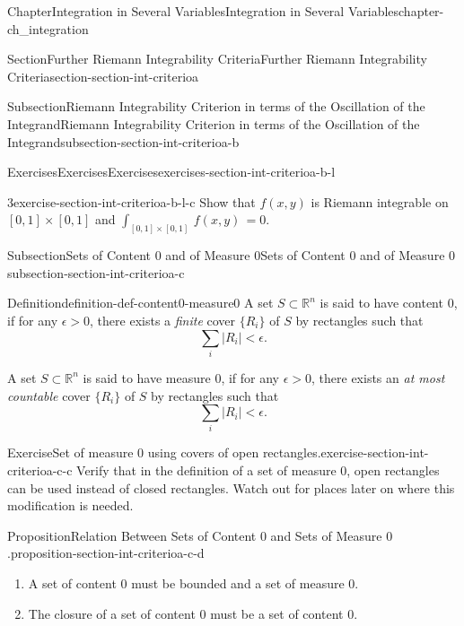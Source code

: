 \documentclass[oneside,10pt,]{book}
\numberwithin{equation}{section}
\newcommand{\bbR}{\mathbb{R}}
\begin{document}
\begin{chapterptx}{Chapter}{Integration in Several Variables}{}{Integration in Several Variables}{}{}{chapter-ch_integration}
\begin{sectionptx}{Section}{Further Riemann Integrability Criteria}{}{Further Riemann Integrability Criteria}{}{}{section-section-int-criterioa}
\begin{subsectionptx}{Subsection}{Riemann Integrability Criterion in terms of the Oscillation of the Integrand}{}{Riemann Integrability Criterion in terms of the Oscillation of the Integrand}{}{}{subsection-section-int-criterioa-b}
\begin{exercises-subsubsection-numberless}{Exercises}{Exercises}{}{Exercises}{}{}{exercises-section-int-criterioa-b-l}
\begin{divisionexercise}{3}{}{}{exercise-section-int-criterioa-b-l-c}
Show that \(f(x, y)\) is Riemann integrable on \([0, 1]\times [0, 1]\) and \(\int_{[0, 1]\times [0, 1]} \, f(x, y)\,  =0\).%
\end{divisionexercise}%
\end{exercises-subsubsection-numberless}
\end{subsectionptx}
%
%
\typeout{************************************************}
\typeout{************************************************}
%
\begin{subsectionptx}{Subsection}{Sets of Content \(0\) and of Measure \(0\)}{}{Sets of Content \(0\) and of Measure \(0\)}{}{}{subsection-section-int-criterioa-c}
\begin{definition}{Definition}{}{definition-def-content0-measure0}%
%
A set \(S\subset \bbR^{n}\) is said to have content \(0\), if for any \(\epsilon >0\), there exists a \emph{finite} cover \(\{R_{i}\} \) of \(S\) by rectangles such that%
\begin{equation*}
\sum_{i}\vert R_{i}\vert < \epsilon.
\end{equation*}
%
\par
A set \(S\subset \bbR^{n}\) is said to have measure \(0\), if for any \(\epsilon >0\), there exists an \emph{at most countable} cover \(\{R_{i}\} \) of \(S\) by rectangles such that%
\begin{equation*}
\sum_{i}\vert R_{i}\vert < \epsilon.
\end{equation*}
%
\end{definition}
\begin{inlineexercise}{Exercise}{Set of measure \(0\) using covers of open rectangles.}{exercise-section-int-criterioa-c-c}%
Verify that in the definition of a set of measure \(0\), open rectangles can be used instead of closed rectangles.  Watch out for places later on where this modification is needed.%
\end{inlineexercise}%
\begin{proposition}{Proposition}{Relation Between Sets of Content \(0\) and Sets of Measure \(0\).}{}{proposition-section-int-criterioa-c-d}%
%
\begin{enumerate}
\item{}A set of content \(0\) must be bounded and a set of measure \(0\).%
\item{}The closure of a set of content \(0\) must be a set of  content \(0\).%

\end{enumerate}
\end{proposition}
\end{subsectionptx}
\end{sectionptx}
\end{chapterptx}
\end{document}
